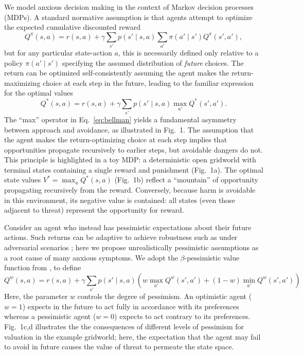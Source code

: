 \documentclass[11pt]{article} %
\begin{document}
We model anxious decision making in the context of Markov decision processes (MDPs). A standard normative assumption is that agents attempt to optimize the expected cumulative discounted reward
\begin{equation*}
Q^\pi(s,a) = r(s,a) + \gamma \sum_{s'} p(s' \mid s,a) \sum_{a'} \pi(a' \mid s') Q^\pi(s',a'),
\end{equation*}
but for any particular state-action $a$, this is necessarily defined only relative to a policy $\pi(a' \mid s')$ specifying the assumed distribution of \emph{future} choices. The return can be optimized self-consistently assuming the agent makes the return-maximizing choice at each step in the future, leading to the familiar expression for the optimal values
\begin{equation}\label{eq:bellman}
 Q^*(s,a) = r(s,a) + \gamma \sum_{s'} p(s' \mid s,a) \max_{a'} Q^*(s',a').
\end{equation}
The ``max'' operator in Eq.~\ref{eq:bellman} yields a fundamental asymmetry between approach and avoidance, as illustrated in Fig.~1. The assumption that the agent makes the return-optimizing choice at each step implies that opportunities propagate recursively to earlier steps, but avoidable dangers do not. This principle is highlighted in a toy MDP: a deterministic open gridworld with terminal states containing a single reward and punishment (Fig.~1a). The optimal state values $V^* = \max_a Q^*(s,a)$ (Fig.~1b) reflect a ``mountain'' of opportunity propagating recursively from the reward. Conversely, because harm is avoidable in this environment, its negative value is contained: all states (even those adjacent to threat) represent the opportunity for reward.

Consider an agent who instead has pessimistic expectations about their future actions. Such returns can be adaptive to achieve robustness such as under adversarial scenarios \cite{Garcia2015}; here we propose unrealistically pessimistic assumptions as a root cause of many anxious symptoms. We adopt the $\beta$-pessimistic value function from \cite{Gaskett2003}, to define
\begin{equation*}
Q^w(s,a) = r(s,a) + \gamma \sum_{s'} p(s' \mid s,a) \left( w \max_{a'} Q^w(s',a') + (1 - w) \min_{a'} Q^w(s',a') \right)
\end{equation*}
Here, the parameter $w$ controls the degree of pessimism. An optimistic agent ($w = 1$) expects in the future to act fully in accordance with its preferences whereas a pessimistic agent ($w = 0$) expects to act contrary to its preferences. Fig.~1c,d illustrates the the consequences of different levels of pessimism for valuation in the example gridworld; here, the expectation that the agent may fail to avoid in future causes the value of threat to permeate the state space.
\end{document}
